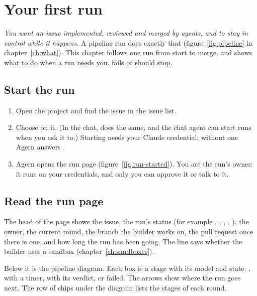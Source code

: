 \chapter{Your first run}\label{ch:run}

\emph{You want an issue implemented, reviewed and merged by agents, and to stay in control while
it happens.} A pipeline run does exactly that (figure~\ref{fig:pipeline} in
chapter~\ref{ch:what}). This chapter follows one run from start to merge, and shows what to do
when a run needs you, fails or should stop.

\section{Start the run}\label{sec:start-run}

\begin{enumerate}
  \item Open the project and find the issue in the issue list.
  \item Choose  on it. (In the chat,  does the same, and the chat
    agent can start runs when you ask it to.) Starting needs your Claude credential; without one
    Agern answers .
  \item Agern opens the run page (figure~\ref{fig:run-started}). You are the run's owner: it runs
    on your credentials, and only you can approve it or talk to it.
\end{enumerate}


\section{Read the run page}\label{sec:run-page}

The head of the page shows the issue, the run's status (for example , ,
, , ), the owner, the current round, the branch the
builder works on, the pull request once there is one, and how long the run has been going. The
 line says whether the builder uses a sandbox (chapter~\ref{ch:sandboxes}).

Below it is the pipeline diagram. Each box is a stage with its model and state:
,  with a timer,  with its verdict, or failed. The arrows show
where the run goes next. The row of chips under the diagram lists the stages of each round.

